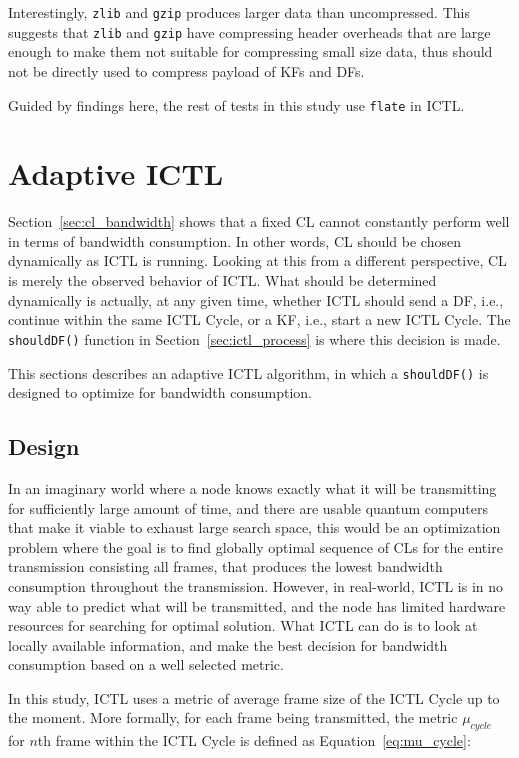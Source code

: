 \documentclass[12pt]{report}
\begin{document}
Interestingly, \texttt{zlib} and \texttt{gzip} produces larger data than uncompressed. This suggests that \texttt{zlib} and \texttt{gzip} have compressing header overheads that are large enough to make them not suitable for compressing small size data, thus should not be directly used to compress payload of KFs and DFs.

Guided by findings here, the rest of tests in this study use \texttt{flate} in ICTL.

\section{Adaptive ICTL}
\label{sec:adaptive_ictl}

Section~\ref{sec:cl_bandwidth} shows that a fixed CL cannot constantly perform well in terms of bandwidth consumption. In other words, CL should be chosen dynamically as ICTL is running. Looking at this from a different perspective, CL is merely the observed behavior of ICTL. What should be determined dynamically is actually, at any given time, whether ICTL should send a DF, i.e., continue within the same ICTL Cycle, or a KF, i.e., start a new ICTL Cycle. The \texttt{shouldDF()} function in Section~\ref{sec:ictl_process} is where this decision is made.

This sections describes an adaptive ICTL algorithm, in which a \texttt{shouldDF()} is designed to optimize for bandwidth consumption.

\subsection{Design}

In an imaginary world where a node knows exactly what it will be transmitting for sufficiently large amount of time, and there are usable quantum computers that make it viable to exhaust large search space, this would be an optimization problem where the goal is to find globally optimal sequence of CLs for the entire transmission consisting all frames, that produces the lowest bandwidth consumption throughout the transmission. However, in real-world, ICTL is in no way able to predict what will be transmitted, and the node has limited hardware resources for searching for optimal solution. What ICTL can do is to look at locally available information, and make the best decision for bandwidth consumption based on a well selected metric. 

In this study, ICTL uses a metric of average frame size of the ICTL Cycle up to the moment. More formally, for each frame being transmitted, the metric $\mu_{cycle}$ for $n$th frame within the ICTL Cycle is defined as Equation~\ref{eq:mu_cycle}:
\end{document}
